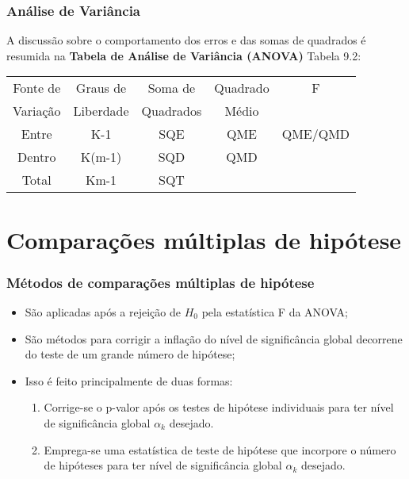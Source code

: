 \documentclass{beamer}
\begin{document}
\begin{frame}
\frametitle{Análise de Variância}
A discussão sobre o comportamento dos erros e das somas de quadrados é resumida na \textbf{Tabela de Análise de Variância (ANOVA)} Tabela 9.2:

\begin{table}[h]
\centering
\begin{tabular}{ccccc}
\hline
Fonte de & Graus de & Soma de & Quadrado & F  \\
Variação & Liberdade & Quadrados & Médio &   \\
\hline
Entre & K-1 & SQE & QME & QME/QMD   \\
Dentro & K(m-1) & SQD & QMD &   \\
\hline
Total & Km-1 & SQT &  &   \\
\hline
\end{tabular}

\end{table}
\end{frame}

\section{Comparações múltiplas de hipótese}
\begin{frame}
\frametitle{Métodos de comparações múltiplas de hipótese}

\begin{itemize}
\item São aplicadas após a rejeição de \(H_0\) pela estatística F da ANOVA;
\item São métodos para corrigir a inflação do nível de significância global decorrene do teste de um grande número de hipótese; 
\item Isso é feito principalmente de duas formas:
\begin{enumerate}
\item Corrige-se o p-valor após os testes de hipótese individuais para ter nível de significância global \(\alpha_k\) desejado.
\item Emprega-se uma estatística de teste de hipótese que incorpore o número de hipóteses para ter nível de significância global \(\alpha_k\) desejado.
\end{enumerate}
\end{itemize}

\end{frame}
\end{document}
